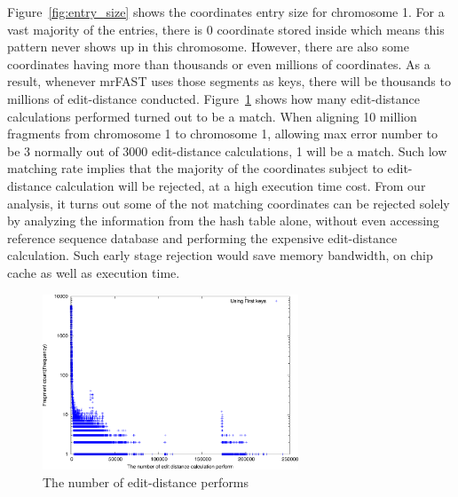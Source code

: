 Figure~\ref{fig:entry_size} shows the coordinates entry size for chromosome 1.
For a vast majority of the entries, there is 0 coordinate stored inside which
means this pattern never shows up in this chromosome. However, there are also
some coordinates having more than thousands or even millions of coordinates. As
a result, whenever mrFAST uses those segments as keys, there will be thousands
to millions of edit-distance conducted.  Figure~\ref{fig:edit_dist} shows how many
edit-distance calculations performed turned out to be a match. When aligning 10
million fragments from chromosome 1 to chromosome 1, allowing max error number
to be 3 normally out of 3000 edit-distance calculations, 1 will be a match.
Such low matching rate implies that the majority of the coordinates subject to
edit-distance calculation will be rejected, at a high execution time cost.
From our analysis, it turns out some of the not matching coordinates can be
rejected solely by analyzing the information from the hash table alone, without
even accessing reference sequence database and performing the expensive
edit-distance calculation. Such early stage rejection would save memory
bandwidth, on chip cache as well as execution time.\\

\begin{figure}[t] 
\centering
\vspace{0.1in}
\includegraphics[width=3in]{./figure/Edit_Dist_B.pdf} \vspace{0in}
\caption{The number of edit-distance performs}
\label{fig:edit_dist} 
\end{figure}

